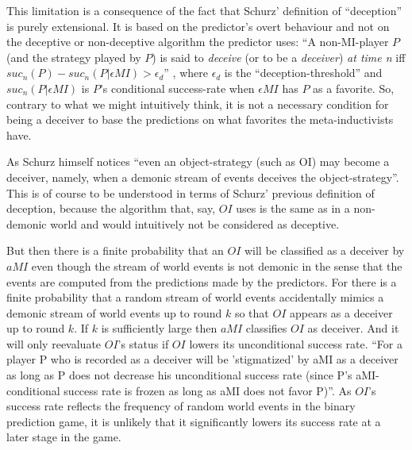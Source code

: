 \documentclass[12pt, a4paper]{article}
\numberwithin{equation}{section}
\begin{document}
This limitation is a consequence of the fact that Schurz' definition of
``deception'' is purely extensional. It is based on the predictor's overt
behaviour and not on the deceptive or non-deceptive algorithm the
predictor uses: ``A non-MI-player $P$ (and the strategy played by $P$) is
said to {\em deceive} (or to be a {\em deceiver}) {\em at time n} iff
$suc_n(P) - suc_n(P|\epsilon MI) > \epsilon_d$'' \cite[p.
293]{schurz:2008}, where $\epsilon_d$ is the ``deception-threshold'' and
$suc_n(P|\epsilon MI)$ is $P$'s conditional success-rate when $\epsilon
MI$ has $P$ as a favorite. So, contrary to what we might intuitively
think, it is not a necessary condition for being a deceiver to base
the predictions on what favorites the meta-inductivists have.

As Schurz himself notices ``even an object-strategy (such as OI) may
become a deceiver, namely, when a demonic stream of events deceives the
object-strategy''\cite[p. 293]{schurz:2008}. This is of course to be
understood in terms of Schurz' previous definition of deception,
because the algorithm that, say, $OI$ uses is the same as in a
non-demonic world and would intuitively not be considered as deceptive. 


But then there is a finite probability that an $OI$ will be classified as
a deceiver by $aMI$ even though the stream of world events is not demonic
in the sense that the events are computed from the predictions made by
the predictors. For there is a finite probability that a random stream of
world events accidentally mimics a demonic stream of world events up to
round $k$ so that $OI$ appears as a deceiver up to round $k$. If $k$ is
sufficiently large then $aMI$ classifies $OI$ as deceiver. And it will
only reevaluate $OI$'s status if $OI$ lowers its unconditional success
rate. ``For a player P who is recorded as a deceiver will be
'stigmatized' by aMI as a deceiver as long as P does not decrease his
unconditional success rate (since P's aMI-conditional success rate is
frozen as long as aMI does not favor P)''\cite[p. 295]{schurz:2008}. As
$OI$'s success rate reflects the frequency of random world events in the
binary prediction game, it is unlikely that it significantly lowers its
success rate at a later stage in the game.
\end{document}
